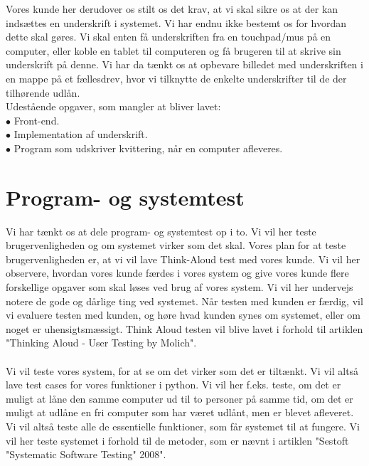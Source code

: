 \documentclass[a4paper]{article}
\begin{document}
Vores kunde her derudover os stilt os det krav, at vi skal sikre os at der kan indsættes en underskrift i systemet. Vi har endnu ikke bestemt os for hvordan dette skal gøres. Vi skal enten få underskriften fra en touchpad/mus på en computer, eller koble en tablet til computeren og få brugeren til at skrive sin underskrift på denne. Vi har da tænkt os at opbevare billedet med underskriften i en mappe på et fællesdrev, hvor vi tilknytte de enkelte underskrifter til de der tilhørende udlån. \\
Udestående opgaver, som mangler at bliver lavet: \\
$\bullet$ Front-end. \\
$\bullet$ Implementation af underskrift. \\
$\bullet$ Program som udskriver kvittering, når en computer afleveres.
\section{Program- og systemtest}
Vi har tænkt os at dele program- og systemtest op i to. Vi vil her teste brugervenligheden og om systemet virker som det skal. Vores plan for at teste brugervenligheden er, at vi vil lave Think-Aloud test med vores kunde. Vi vil her observere, hvordan vores kunde færdes i vores system og give vores kunde flere forskellige opgaver som skal løses ved brug af vores system. Vi vil her undervejs notere de gode og dårlige ting ved systemet. Når testen med kunden er færdig, vil vi evaluere testen med kunden, og høre hvad kunden synes om systemet, eller om noget er uhensigtsmæssigt. Think Aloud testen vil blive lavet i forhold til artiklen "Thinking Aloud - User Testing by Molich". \\ \\
Vi vil teste vores system, for at se om det virker som det er tiltænkt. Vi vil altså lave test cases for vores funktioner i python. Vi vil her f.eks. teste, om det er muligt at låne den samme computer ud til to personer på samme tid, om det er muligt at udlåne en fri computer som har været udlånt, men er blevet afleveret. Vi vil altså teste alle de essentielle funktioner, som får systemet til at fungere. Vi vil her teste systemet i forhold til de metoder, som er nævnt i artiklen "Sestoft "Systematic Software Testing" 2008".
\end{document}
